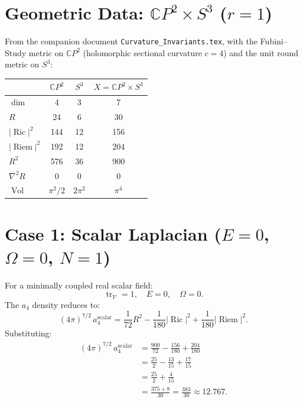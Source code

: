 \documentclass[12pt,a4paper]{article}
\theoremstyle{definition}
\DeclareMathOperator{\tr}{tr}
\DeclareMathOperator{\Ric}{Ric}
\DeclareMathOperator{\Riem}{Riem}
\DeclareMathOperator{\Vol}{Vol}
\begin{document}
\section{Geometric Data: $\mathbb{C}P^2 \times S^3$ ($r = 1$)}
\label{sec:geometry}

From the companion document \texttt{Curvature\_Invariants.tex},
with the Fubini--Study metric on $\mathbb{C}P^2$ (holomorphic
sectional curvature $c = 4$) and the unit round metric on $S^3$:

\begin{center}
\renewcommand{\arraystretch}{1.3}
\begin{tabular}{lccc}
\toprule
& $\mathbb{C}P^2$ & $S^3$ & $X = \mathbb{C}P^2 \times S^3$ \\
\midrule
$\dim$ & 4 & 3 & 7 \\
$R$ & 24 & 6 & 30 \\
$|\Ric|^2$ & 144 & 12 & 156 \\
$|\Riem|^2$ & 192 & 12 & 204 \\
$R^2$ & 576 & 36 & 900 \\
$\nabla^2 R$ & 0 & 0 & 0 \\
$\Vol$ & $\pi^2/2$ & $2\pi^2$ & $\pi^4$ \\
\bottomrule
\end{tabular}
\end{center}


\section{Case 1: Scalar Laplacian ($E = 0$, $\Omega = 0$, $N = 1$)}
\label{sec:scalar}

For a minimally coupled real scalar field:
\[
\tr_{\mathcal{V}} = 1, \quad E = 0, \quad \Omega = 0.
\]
The $a_4$ density reduces to:
\begin{equation}\label{eq:a4-scalar}
(4\pi)^{7/2}\,a_4^{\text{scalar}} = \frac{1}{72}R^2
  - \frac{1}{180}|\Ric|^2 + \frac{1}{180}|\Riem|^2.
\end{equation}
Substituting:
\begin{align}
(4\pi)^{7/2}\,a_4^{\text{scalar}}
  &= \frac{900}{72} - \frac{156}{180} + \frac{204}{180} \nonumber\\
  &= \frac{25}{2} - \frac{13}{15} + \frac{17}{15} \nonumber\\
  &= \frac{25}{2} + \frac{4}{15} \nonumber\\
  &= \frac{375 + 8}{30} = \boxed{\frac{383}{30} \approx 12.767}.
\end{align}
\end{document}
